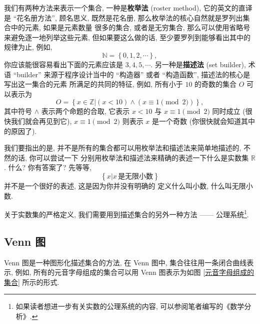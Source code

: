 \documentclass[10pt,UTF8]{book} %
\begin{document}
我们有两种方法来表示一个集合, 一种是\textbf{枚举法} (roster method), 它的英文的直译
是 “花名册方法”, 顾名思义, 既然是花名册, 那么枚举法的核心自然就是罗列出集合中的元素, 如果是元素数量
很多的集合, 或者是无穷集合,
那么可以使用省略号来避免逐一地列举这些元素, 但如果要这么做的话, 至少要罗列到能够看出其中的规律为止, 例如,
\[\mathbb{N} = \left\{0, 1, 2, \cdots \right\},\]
你应该能很容易看出下面的元素应该是 $3,4,5, \cdots$. 另一种是\textbf{描述法} (set builder),
术语 “builder” 来源于程序设计当中的 “构造器” 或者 “构造函数”, 描述法的核心是写出这一集合的元素
所满足的共同的特征, 例如, 所有小于 $10$ 的奇数的集合 $O$ 可以表示为
\[ O = \left\{ x \in \mathbb{Z} | (x < 10) \wedge (x \equiv 1 \pmod{2}) \right\}, \] 
其中符号 $\wedge$ 表示两个命题的合取, 它表示 $x<10$ 与 $x \equiv 1 \pmod{2}$ 同时成立
(很快我们就会再见到它),
$x \equiv 1 \pmod{2}$ 则表示 $x$ 是一个奇数 (你很快就会知道其中的原因了).

我们要指出的是, 并不是所有的集合都可以用枚举法和描述法来简单地描述的, 不然的话, 你可以尝试一下
分别用枚举法和描述法来精确的表述一下什么是实数集 $\mathbb{R}$. 什么? 你有答案了? 先等等,
\[ \left\{ x| x \,\text{是无限小数} \right\}\] 并不是一个很好的表述, 这是因为你并没有明确的
定义什么叫小数, 什么叫无限小数.

关于实数集的严格定义, 我们需要用到描述集合的另外一种方法 —— 公理系统\footnote{
    如果读者想进一步有关实数的公理系统的内容, 可以参阅笔者编写的《数学分析》.
}.

\subsection{Venn 图}

Venn 图是一种图形化描述集合的方法, 在 Venn 图中, 集合往往用一条闭合曲线表示,
例如, 所有的元音字母组成的集合可以用 Venn 图表示为如图 \ref{元音字母组成的集合} 所示的形式.
\end{document}
